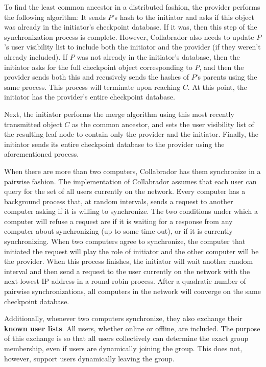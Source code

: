 \documentclass[11pt,titlepage]{article}
\begin{document}
To find the least common ancestor in a distributed fashion, the
provider performs the following algorithm: It sends $P$'s hash to the
initiator and asks if this object was already in the initiator's
checkpoint database. If it was, then this step of the synchronization
process is complete. However, Collabrador also needs to update $P$'s
user visibility list to include both the initiator and the provider
(if they weren't already included). If $P$ was not already in the
initiator's database, then the initiator asks for the full checkpoint
object corresponding to $P$, and then the provider sends both this and
recusively sends the hashes of $P$'s parents using the same
process. This process will terminate upon reaching $C$. At this point,
the initiator has the provider's entire checkpoint database.

Next, the initiator performs the merge algorithm using this most
recently transmitted object $C$ as the common ancestor, and sets the
user visibility list of the resulting leaf node to contain only the
provider and the initiator. Finally, the initiator sends its entire
checkpoint database to the provider using the aforementioned process.

When there are more than two computers, Collabrador has them
synchronize in a pairwise fashion. The implementation of Collabrador
assumes that each user can query for the set of all users currently on
the network. Every computer has a background process that, at random
intervals, sends a request to another computer asking if it is willing
to synchronize. The two conditions under which a computer will refuse
a request are if it is waiting for a response from any computer about
synchronizing (up to some time-out), or if it is currently
synchronizing. When two computers agree to synchronize, the computer
that initiated the request will play the role of initiator and the
other computer will be the provider. When this process finishes, the
initiator will wait another random interval and then send a request to
the user currently on the network with the next-lowest IP address in a
round-robin process. After a quadratic number of pairwise
synchronizations, all computers in the network will converge on the
same checkpoint database.

Additionally, whenever two computers synchronize, they also exchange
their \textbf{known user lists}. All users, whether online or offline,
are included. The purpose of this exchange is so that all users
collectively can determine the exact group membership, even if users
are dynamically joining the group. This does not, however, support
users dynamically leaving the group.
\end{document}
